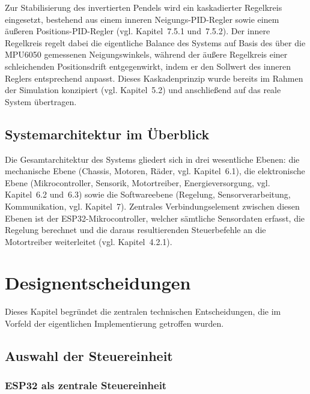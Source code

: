 \documentclass[12pt,ngerman,numbers=noenddot,abstracton,headsepline]{scrreprt}
\begin{document}
Zur Stabilisierung des invertierten Pendels wird ein kaskadierter Regelkreis eingesetzt, bestehend aus einem inneren Neigungs-PID-Regler sowie einem äußeren Positions-PID-Regler (vgl. Kapitel~7.5.1 und~7.5.2). Der innere Regelkreis regelt dabei die eigentliche Balance des Systems auf Basis des über die MPU6050 gemessenen Neigungswinkels, während der äußere Regelkreis einer schleichenden Positionsdrift entgegenwirkt, indem er den Sollwert des inneren Reglers entsprechend anpasst. Dieses Kaskadenprinzip wurde bereits im Rahmen der Simulation konzipiert (vgl. Kapitel~5.2) und anschließend auf das reale System übertragen.

\section{Systemarchitektur im Überblick}
\label{sec:systemarchitektur_ueberblick}

Die Gesamtarchitektur des Systems gliedert sich in drei wesentliche Ebenen: die mechanische Ebene (Chassis, Motoren, Räder, vgl. Kapitel~6.1), die elektronische Ebene (Mikrocontroller, Sensorik, Motortreiber, Energieversorgung, vgl. Kapitel~6.2 und~6.3) sowie die Softwareebene (Regelung, Sensorverarbeitung, Kommunikation, vgl. Kapitel~7). Zentrales Verbindungselement zwischen diesen Ebenen ist der ESP32-Mikrocontroller, welcher sämtliche Sensordaten erfasst, die Regelung berechnet und die daraus resultierenden Steuerbefehle an die Motortreiber weiterleitet (vgl. Kapitel~4.2.1).

\chapter{Designentscheidungen}
\label{ch:designentscheidungen}

Dieses Kapitel begründet die zentralen technischen Entscheidungen, die im Vorfeld der eigentlichen Implementierung getroffen wurden.

\section{Auswahl der Steuereinheit}
\label{sec:auswahl_steuereinheit}

\subsection{ESP32 als zentrale Steuereinheit}
\label{subsec:esp32_designentscheidung}
\end{document}
